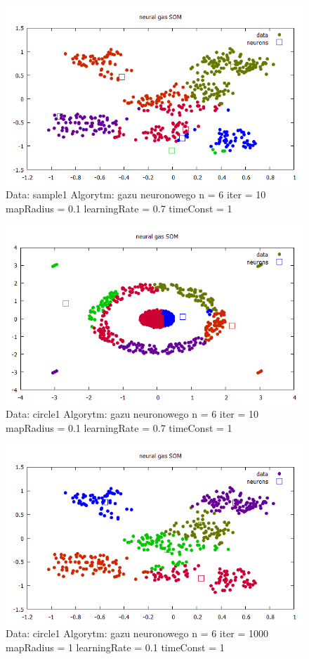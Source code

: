 \documentclass{classrep}
\begin{document}
{{{\begin{figure}[h!]
\centering
 \includegraphics[width=12cm]{img/neuralsample1_6_10.png}
 \vspace{-0.3cm}
 \caption{Data: sample1 Algorytm: gazu neuronowego n = 6 iter = 10
  mapRadius = 0.1 learningRate = 0.7 timeConst = 1  
}
\end{figure}

\newpage
\begin{figure}[h!]
\centering
 \includegraphics[width=12cm]{img/neuralcircle1_6_10.png}
 \vspace{-0.3cm}
 \caption{Data: circle1 Algorytm: gazu neuronowego n = 6 iter = 10
  mapRadius = 0.1 learningRate = 0.7 timeConst = 1  
}
\end{figure}
\newpage

\begin{figure}[h!]
\centering
 \includegraphics[width=12cm]{img/neuralsample1_6_1000.png}
 \vspace{-0.3cm}
 \caption{Data: circle1 Algorytm: gazu neuronowego n = 6 iter = 1000
  mapRadius = 1 learningRate = 0.1 timeConst = 1  
}
\end{figure}

}}}
\end{document}
